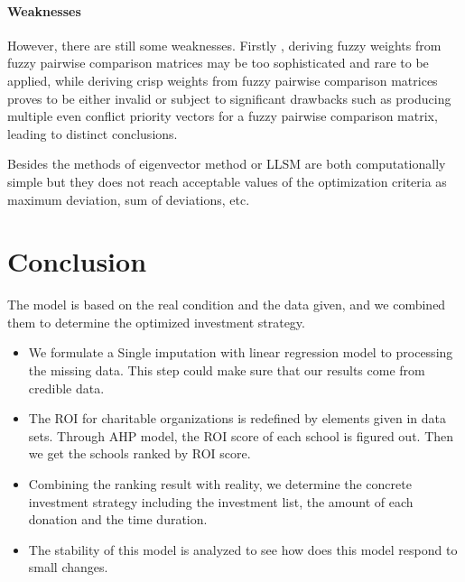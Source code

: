 \paragraph{Weaknesses}


However, there are still some weaknesses. Firstly , deriving fuzzy weights from fuzzy pairwise comparison matrices may be too sophisticated and rare to be applied, while deriving crisp weights from fuzzy pairwise comparison matrices proves to be either invalid or subject to significant drawbacks such as producing multiple even conflict priority vectors for a fuzzy pairwise comparison matrix, leading to distinct conclusions\cite{url11}.

Besides the methods of eigenvector method or LLSM are both computationally simple but they does not reach acceptable values of the optimization criteria as maximum deviation, sum of deviations, etc\cite{url12}.



\section{Conclusion}

The model is based on the real condition and the data given, and we combined them to determine the optimized investment strategy.
\begin{itemize}
\item We formulate a Single imputation with linear regression model to processing the missing data. This step could make sure that our results come from credible data.
\item The ROI for charitable organizations is redefined by elements given in data sets. Through AHP model, the ROI score of each school is figured out. Then we get the schools ranked by ROI score.
\item Combining the ranking result with reality, we determine the concrete investment strategy including the investment list, the amount of each donation and the time duration.
\item The stability of this model is analyzed to see how does this model respond to small changes.

\end{itemize}


\small




